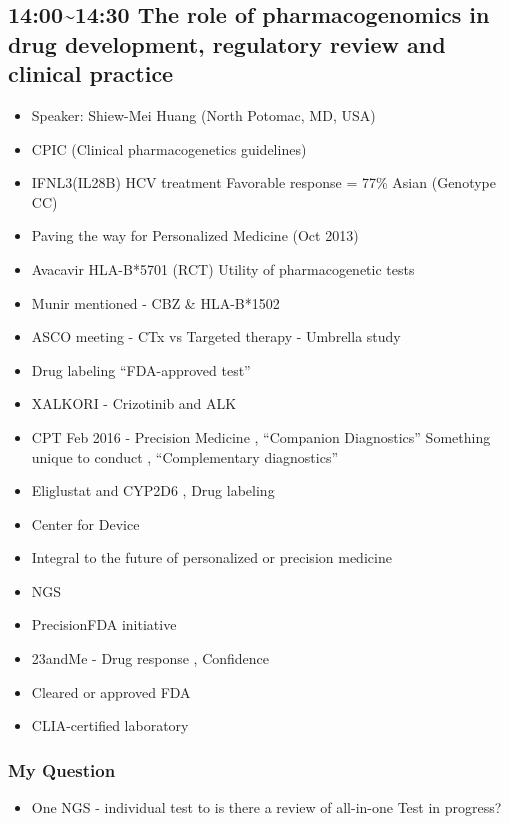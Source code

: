 \documentclass[]{book}
\providecommand{\tightlist}{%
  \setlength{\itemsep}{0pt}\setlength{\parskip}{0pt}}
\begin{document}
\subsection{14:00\textasciitilde{}14:30 The role of pharmacogenomics in
drug development, regulatory review and clinical
practice}\label{the-role-of-pharmacogenomics-in-drug-development-regulatory-review-and-clinical-practice}

\begin{itemize}
\tightlist
\item
  Speaker: Shiew-Mei Huang (North Potomac, MD, USA)
\item
  CPIC (Clinical pharmacogenetics guidelines)
\item
  IFNL3(IL28B) HCV treatment Favorable response = 77\% Asian (Genotype
  CC)
\item
  Paving the way for Personalized Medicine (Oct 2013)
\item
  Avacavir HLA-B*5701 (RCT) Utility of pharmacogenetic tests
\item
  Munir mentioned - CBZ \& HLA-B*1502
\item
  ASCO meeting - CTx vs Targeted therapy - Umbrella study
\item
  Drug labeling ``FDA-approved test''
\item
  XALKORI - Crizotinib and ALK
\item
  CPT Feb 2016 - Precision Medicine , ``Companion Diagnostics''
  Something unique to conduct , ``Complementary diagnostics''
\item
  Eliglustat and CYP2D6 , Drug labeling
\item
  Center for Device
\item
  Integral to the future of personalized or precision medicine
\item
  NGS
\item
  PrecisionFDA initiative
\item
  23andMe - Drug response , Confidence
\item
  Cleared or approved FDA
\item
  CLIA-certified laboratory
\end{itemize}

\subsubsection{My Question}\label{my-question}

\begin{itemize}
\tightlist
\item
  One NGS - individual test to is there a review of all-in-one Test in
  progress?
\end{itemize}
\end{document}
